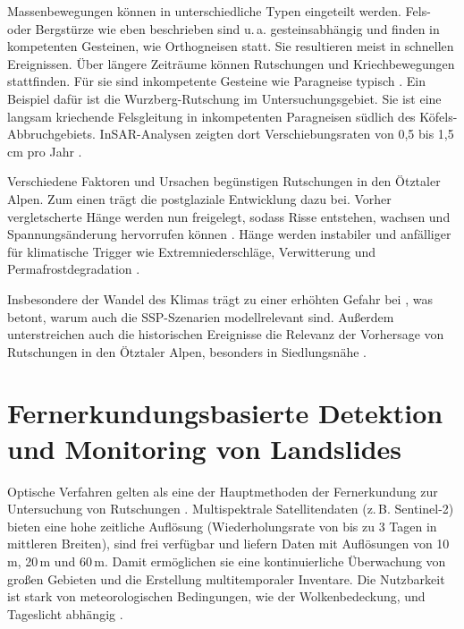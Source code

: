 \documentclass[../main.tex]{subfiles}
\begin{document}
Massenbewegungen können in unterschiedliche Typen eingeteilt werden. Fels- oder Bergstürze wie eben beschrieben sind u.\,a. gesteinsabhängig und finden in kompetenten Gesteinen, wie Orthogneisen statt. Sie resultieren meist in schnellen Ereignissen. Über längere Zeiträume können Rutschungen und Kriechbewegungen stattfinden. Für sie sind inkompetente Gesteine wie Paragneise typisch \autocite{pragerGeologicalControlsSlope2009}. Ein Beispiel dafür ist die Wurzberg-Rutschung im Untersuchungsgebiet. Sie ist eine langsam kriechende Felsgleitung in inkompetenten Paragneisen südlich des Köfels-Abbruchgebiets. InSAR-Analysen zeigten dort Verschiebungsraten von 0,5 bis 1,5\,cm pro Jahr \autocite{pragerGeologicalControlsSlope2009}.

Verschiedene Faktoren und Ursachen begünstigen Rutschungen in den Ötztaler Alpen. Zum einen trägt die postglaziale Entwicklung dazu bei. Vorher vergletscherte Hänge werden nun freigelegt, sodass Risse entstehen, wachsen und Spannungsänderung hervorrufen können \autocite{pragerGeologicalControlsSlope2009}. Hänge werden instabiler und anfälliger für klimatische Trigger wie Extremniederschläge, Verwitterung und Permafrostdegradation \autocite{casagliLandslideDetectionMonitoring2023, hermleTimelyPredictionPotential2021, hermlePerformanceTestingOptical2022}.

Insbesondere der Wandel des Klimas trägt zu einer erhöhten Gefahr bei \autocite{hermleTimelyPredictionPotential2021, hermlePerformanceTestingOptical2022}, was betont, warum auch die SSP-Szenarien modellrelevant sind. Außerdem unterstreichen auch die historischen Ereignisse die Relevanz der Vorhersage von Rutschungen in den Ötztaler Alpen, besonders in Siedlungsnähe \autocite{casagliLandslideDetectionMonitoring2023, hermleTimelyPredictionPotential2021}.

\section{Fernerkundungsbasierte Detektion und Monitoring von Landslides}

Optische Verfahren gelten als eine der Hauptmethoden der Fernerkundung zur Untersuchung von Rutschungen \autocite{kaabRemoteSensingGlacier2005, scaioniRemoteSensingLandslide2014}. Multispektrale Satellitendaten (z.\,B. Sentinel-2) bieten eine hohe zeitliche Auflösung (Wiederholungsrate von bis zu 3 Tagen in mittleren Breiten), sind frei verfügbar und liefern Daten mit Auflösungen von 10\,m, 20\,m und 60\,m. Damit ermöglichen sie eine kontinuierliche Überwachung von großen Gebieten und die Erstellung multitemporaler Inventare. Die Nutzbarkeit ist stark von meteorologischen Bedingungen, wie der Wolkenbedeckung, und Tageslicht abhängig \autocite{vanwykdevriesDetectionSlowmovingLandslides2024, kaabRemoteSensingGlacier2005, scaioniRemoteSensingLandslide2014, strzabalaIdentificationLandslidePrecursors2024}.
\end{document}
